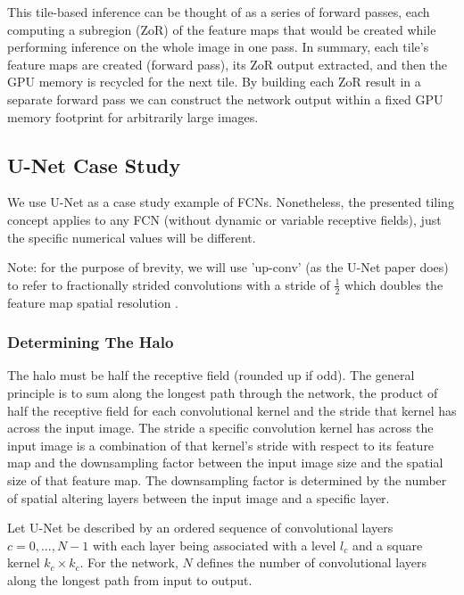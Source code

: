\documentclass[twoside,11pt]{article}
\begin{document}
This tile-based inference can be thought of as a series of forward passes, each computing a subregion (ZoR) of the feature maps that would be created while performing inference on the whole image in one pass. 
In summary, each tile's feature maps are created (forward pass), its ZoR output extracted, and then the GPU memory is recycled for the next tile. By building each ZoR result in a separate forward pass we can construct the network output within a fixed GPU memory footprint for arbitrarily large images. 

\subsection{U-Net Case Study}

We use U-Net \citep{Ronneberger2015a} as a case study example of FCNs. Nonetheless, the presented tiling concept applies to any FCN (without dynamic or variable receptive fields), just the specific numerical values will be different. 

Note: for the purpose of brevity, we will use 'up-conv' (as the U-Net paper does) to refer to fractionally strided convolutions with a stride of $\frac{1}{2}$ which doubles the feature map spatial resolution \citep{Dumoulin2018}.

\subsubsection{Determining The Halo}

The halo must be half the receptive field (rounded up if odd). 
The general principle is to sum along the longest path through the network, the product of half the receptive field for each convolutional kernel and the stride that kernel has across the input image. The stride a specific convolution kernel has across the input image is a combination of that kernel's stride with respect to its feature map and the downsampling factor between the input image size and the spatial size of that feature map. The downsampling factor is determined by the number of spatial altering layers between the input image and a specific layer. 

Let U-Net be described by an ordered sequence of convolutional layers $c={0, ..., N-1}$ with each layer being associated with a level $l_{c}$ and a square kernel $k_{c} \times k_{c}$. 
For the network, $N$ defines the number of convolutional layers along the longest path from input to output. 
\end{document}
